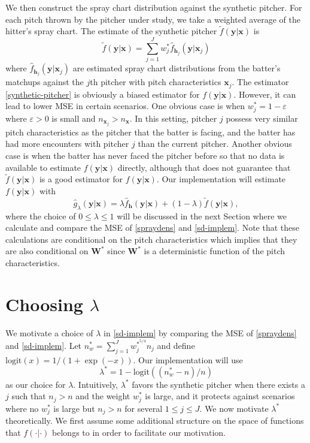 \documentclass[11pt]{article}
\newcommand{\W}{\textbf{W}}
\newcommand{\y}{\textbf{y}}
\newcommand{\x}{\textbf{x}}
\newcommand{\h}{\textbf{h}}
\newcommand{\Wstar}{\W^{\textstyle{*}}}
\newcommand{\wstar}{w^{\textstyle{*}}}
\newcommand{\wstarpwr}{w^{\textstyle{*}^{5/4}}}
\newcommand{\lamstar}{\lambda^{\textstyle{*}}}
\begin{document}
We then construct the spray chart distribution against the synthetic pitcher. For each pitch thrown by the pitcher under study, we take a weighted average of the hitter's spray chart. The estimate of the synthetic pitcher $\tilde{f}(\y|\x)$ is  
\begin{equation} \label{synthetic-pitcher}
  \tilde{f}(\y|\x) = \sum_{j=1}^J \wstar_j\hat{f}_{\h_j}(\y|\x_j)
\end{equation}
where $\hat{f}_{\h_j}(\y|\x_j)$ are estimated spray chart distributions from the batter's matchups against the $j$th pitcher with pitch characteristics $\x_j$. The estimator \eqref{synthetic-pitcher} is obviously a biased estimator for $f(\y|\x)$. However, it can lead to lower MSE in certain scenarios. One obvious case is when $\wstar_j = 1 - \varepsilon$ where $\varepsilon > 0$ is small and $n_{\x_j} > n_{\x}$. In this setting, pitcher $j$ possess very similar pitch characteristics as the pitcher that the batter is facing, and the batter has had more encounters with pitcher $j$ than the current pitcher. Another obvious case is when the batter has never faced the pitcher before so that no data is available to estimate $f(\y|\x)$ directly, although that does not guarantee that $\tilde{f}(\y|\x)$ is a good estimator for $f(\y|\x)$. Our implementation will estimate $f(\y|\x)$ with
\begin{equation} \label{sd-implem}
  \hat{g}_{\lambda}(\y|\x) = \lambda \hat f_\h(\y|\x) + (1 - \lambda)\tilde{f}(\y|\x),
\end{equation}
where the choice of $0 \leq \lambda \leq 1$ will be discussed in the next Section where we  calculate and compare the MSE of \eqref{spraydens} and \eqref{sd-implem}. Note that these calculations are conditional on the pitch characteristics which implies that they are also conditional on $\Wstar$ since $\Wstar$ is a deterministic function of the pitch characteristics.



\section{Choosing $\lambda$}

We motivate a choice of $\lambda$ in \eqref{sd-implem} by comparing the MSE of \eqref{spraydens} and \eqref{sd-implem}. Let $n_\wstar = \sum_{j=1}^J \wstarpwr_j n_j$ and define $\text{logit}(x) = 1/(1 + \exp(-x))$. Our implementation will use 
$$
  \lamstar = 1 - \text{logit}\left((n_\wstar - n)/n\right)
$$ 
as our choice for $\lambda$. Intuitively, $\lamstar$ favors the synthetic pitcher when there exists a $j$ such that $n_j > n$ and the weight $\wstar_j$ is large, and it protects against scenarios where no $\wstar_j$ is large but $n_j > n$ for several $1 \leq j \leq J$. We now motivate $\lamstar$ theoretically. We first assume some additional structure on the space of functions that $f(\cdot|\cdot)$ belongs to in order to facilitate our motivation.
\end{document}
